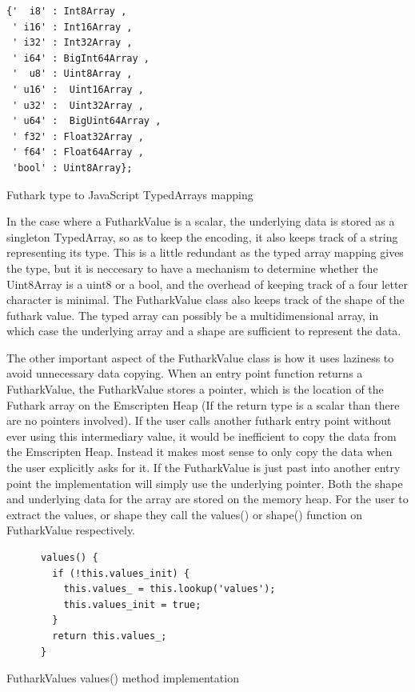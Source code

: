 \documentclass[11pt]{book}
\begin{document}
\begin{listing}[H]
\begin{verbatim}
{'  i8' : Int8Array ,
 ' i16' : Int16Array ,
 ' i32' : Int32Array ,
 ' i64' : BigInt64Array ,
 '  u8' : Uint8Array ,
 ' u16' :  Uint16Array ,
 ' u32' :  Uint32Array ,
 ' u64' :  BigUint64Array ,
 ' f32' : Float32Array ,
 ' f64' : Float64Array ,
 'bool' : Uint8Array};
\end{verbatim}
\caption{Futhark type to JavaScript TypedArrays mapping}
\label{lst:type-mapping}
\end{listing}

In the case where a FutharkValue is a scalar, the underlying data is stored as a singleton TypedArray, so as to keep the encoding, it also keeps track of a string representing its type. This is a little redundant as the typed array mapping gives the type, but it is neccesary to have a mechanism to determine whether the Uint8Array is a uint8 or a bool, and the overhead of keeping track of a four letter character is minimal. The FutharkValue class also keeps track of the shape of the futhark value. The typed array can possibly be a multidimensional array, in which case the underlying array and a shape are sufficient to represent the data.

The other important aspect of the FutharkValue class is how it uses laziness to avoid unnecessary data copying. When an entry point function returns a FutharkValue, the FutharkValue stores a pointer, which is the location of the Futhark array on the Emscripten Heap (If the return type is a scalar than there are no pointers involved). If the user calls another futhark entry point without ever using this intermediary value, it would be inefficient to copy the data from the Emscripten Heap. Instead it makes most sense to only copy the data when the user explicitly asks for it. If the FutharkValue is just past into another entry point the implementation will simply use the underlying pointer. Both the shape and underlying data for the array are stored on the memory heap. For the user to extract the values, or shape they call the values() or shape() function on FutharkValue respectively.
\begin{listing}[H]
\begin{verbatim}
      values() {
        if (!this.values_init) {
          this.values_ = this.lookup('values');
          this.values_init = true;
        }
        return this.values_;
      }
\end{verbatim}
\caption{FutharkValues values() method implementation}
\label{lst:values-implementation}
\end{listing}
\end{document}
